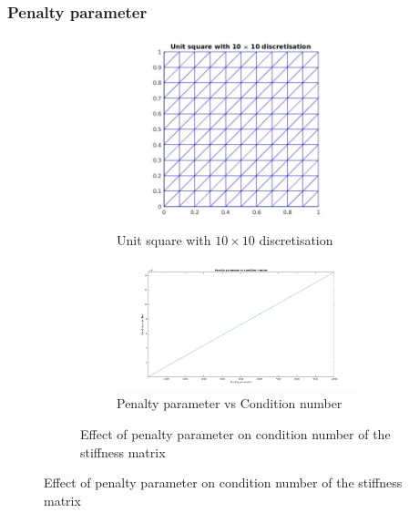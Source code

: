 \documentclass{beamer}
\begin{document}
\begin{frame}
\frametitle{Penalty parameter}
\begin{figure}
\begin{figure}
\begin{subfigure}{0.4\textwidth}	
  \includegraphics[width=\linewidth]{grid_penalty_parameter.jpg}
  \caption{Unit square with $10 \times 10$ discretisation}
  \label{grid_penalty_para}
\end{subfigure}
\begin{subfigure}{0.4\textwidth}	
	\includegraphics[width=\linewidth]{penalty_condition_number.jpg}
	\caption{Penalty parameter vs Condition number}
	\label{penalty_condition_number}
\end{subfigure}
\caption{Effect of penalty parameter on condition number of the stiffness matrix}
\label{effect_penalty_parameter}
\end{figure}
\end{figure}
\end{frame}
\end{document}
